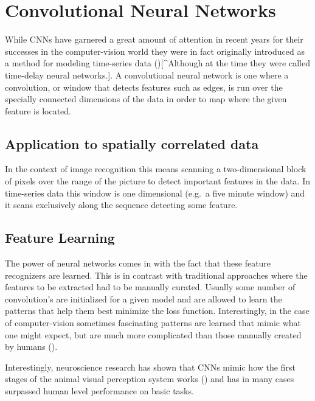 \documentclass[]{book}
\theoremstyle{definition}
\theoremstyle{definition}
\theoremstyle{definition}
\theoremstyle{remark}
\begin{document}
\section{Convolutional Neural
Networks}\label{convolutional-neural-networks}

While CNNs have garnered a great amount of attention in recent years for
their successes in the computer-vision world they were in fact
originally introduced as a method for modeling time-series data
(\citet{hinton_cnn}){[}\^{}Although at the time they were called
time-delay neural networks.{]}. A convolutional neural network is one
where a convolution, or window that detects features such as edges, is
run over the specially connected dimensions of the data in order to map
where the given feature is located.

\subsection{Application to spatially correlated
data}\label{application-to-spatially-correlated-data}

In the context of image recognition this means scanning a
two-dimensional block of pixels over the range of the picture to detect
important features in the data. In time-series data this window is one
dimensional (e.g.~a five minute window) and it scans exclusively along
the sequence detecting some feature.

\subsection{Feature Learning}\label{feature-learning}

The power of neural networks comes in with the fact that these feature
recognizers are learned. This is in contrast with traditional approaches
where the features to be extracted had to be manually curated. Usually
some number of convolution's are initialized for a given model and are
allowed to learn the patterns that help them best minimize the loss
function. Interestingly, in the case of computer-vision sometimes
fascinating patterns are learned that mimic what one might expect, but
are much more complicated than those manually created by humans
(\citet{cnn_vis}).

Interestingly, neuroscience research has shown that CNNs mimic how the
first stages of the animal visual perception system works
(\citet{cnn_animals}) and has in many cases surpassed human level
performance on basic tasks.
\end{document}

